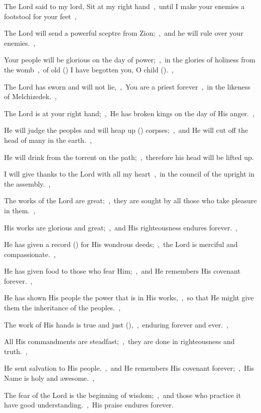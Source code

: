 \documentclass[12pt,twoside,a5paper]{article}
\begin{document}
\begin{normalparskip}
  The Lord said to my lord, Sit at my right hand~\sep\ until I make your enemies a footstool for your feet~\sep


  The Lord will send a powerful sceptre from Zion;~\sep\ and he will rule over your enemies.~\sep

  Your people will be glorious on the day of power;~\sep\ in the glories of holiness from the womb~\sep\ of old () I have begotten you, O child ().~\sep

  The Lord has sworn and will not lie,~\sep\ You are a priest forever~\sep\ in the likeness of Melchizedek.~\sep

  The Lord is at your right hand;~\sep\ He has broken kings on the day of His anger.~\sep

  He will judge the peoples and will heap up () corpses;~\sep\ and He will cut off the head of many in the earth.~\sep

  He will drink from the torrent on the path;~\sep\ therefore his head will be lifted up.
\end{normalparskip}


\begin{normalparskip}
  I will give thanks to the Lord with all my heart~\sep\ in the council of the upright in the assembly.~\sep


  The works of the Lord are great;~\sep\ they are sought by all those who take pleasure in them.~\sep

  His works are glorious and great;~\sep\ and His righteousness endures forever.~\sep

  He has given a record () for His wondrous deeds;~\sep\ the Lord is merciful and compassionate.~\sep

  He has given food to those who fear Him;~\sep\ and He remembers His covenant forever.~\sep

  He has shown His people the power that is in His works,~\sep\ so that He might give them the inheritance of the peoples.~\sep

  The work of His hands is true and just (),~\sep\ enduring forever and ever.~\sep

  All His commandments are steadfast;~\sep\ they are done in righteousness and truth.~\sep

  He sent salvation to His people.~\sep\ and He remembers His covenant forever;~\sep\ His Name is holy and awesome.~\sep

  The fear of the Lord is the beginning of wisdom;~\sep\ and those who practice it have good understanding.~\sep\ His praise endures forever.
\end{normalparskip}
\end{document}
